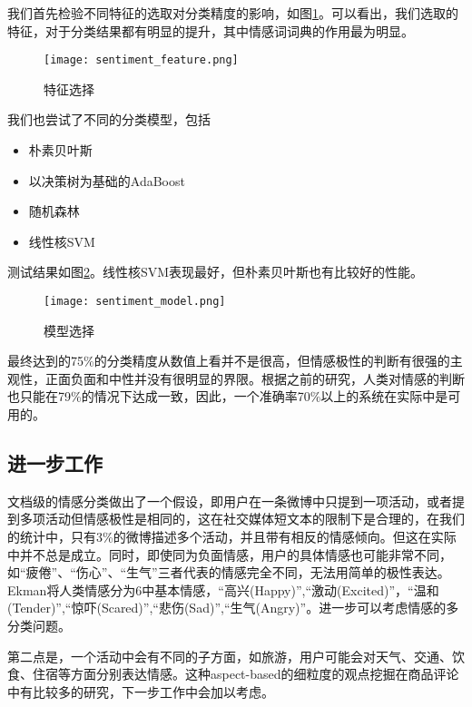 我们首先检验不同特征的选取对分类精度的影响，如图\ref{fig:sentiment_feature}。可以看出，我们选取的特征，对于分类结果都有明显的提升，其中情感词词典的作用最为明显。
\begin{figure}[!h]
\centering
\texttt{[image: sentiment\_feature.png]}
\caption{特征选择}
\label{fig:sentiment_feature}
\end{figure}

我们也尝试了不同的分类模型，包括
\begin{itemize}
\item 朴素贝叶斯
\item 以决策树为基础的AdaBoost
\item 随机森林
\item 线性核SVM
\end{itemize}
测试结果如图\ref{fig:sentiment_model}。线性核SVM表现最好，但朴素贝叶斯也有比较好的性能。

\begin{figure}[!h]
\centering
\texttt{[image: sentiment\_model.png]}
\caption{模型选择}
\label{fig:sentiment_model}
\end{figure}

最终达到的75\%的分类精度从数值上看并不是很高，但情感极性的判断有很强的主观性，正面负面和中性并没有很明显的界限。根据之前的研究，人类对情感的判断也只能在79\%的情况下达成一致，因此，一个准确率70\%以上的系统在实际中是可用的。

\subsection{进一步工作}
文档级的情感分类做出了一个假设，即用户在一条微博中只提到一项活动，或者提到多项活动但情感极性是相同的，这在社交媒体短文本的限制下是合理的，在我们的统计中，只有3\%的微博描述多个活动，并且带有相反的情感倾向。但这在实际中并不总是成立。同时，即使同为负面情感，用户的具体情感也可能非常不同，如``疲倦''、``伤心''、``生气''三者代表的情感完全不同，无法用简单的极性表达。Ekman\cite{ekman1992argument}将人类情感分为6中基本情感，``高兴(Happy)'',``激动(Excited)''，``温和(Tender)'',``惊吓(Scared)'',``悲伤(Sad)'',``生气(Angry)''。进一步可以考虑情感的多分类问题。

第二点是，一个活动中会有不同的子方面，如旅游，用户可能会对天气、交通、饮食、住宿等方面分别表达情感。这种aspect-based的细粒度的观点挖掘在商品评论中有比较多的研究，下一步工作中会加以考虑。



